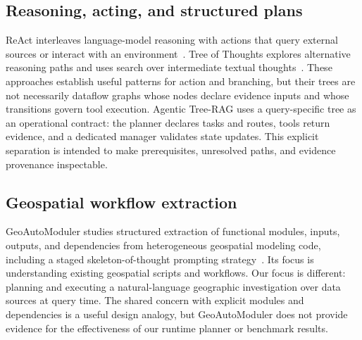 \subsection{Reasoning, acting, and structured plans}
ReAct interleaves language-model reasoning with actions that query external sources or interact with an environment~\cite{yao2023react}. Tree of Thoughts explores alternative reasoning paths and uses search over intermediate textual thoughts~\cite{yao2023tot}. These approaches establish useful patterns for action and branching, but their trees are not necessarily dataflow graphs whose nodes declare evidence inputs and whose transitions govern tool execution. Agentic Tree-RAG uses a query-specific tree as an operational contract: the planner declares tasks and routes, tools return evidence, and a dedicated manager validates state updates. This explicit separation is intended to make prerequisites, unresolved paths, and evidence provenance inspectable.

\subsection{Geospatial workflow extraction}
GeoAutoModuler studies structured extraction of functional modules, inputs, outputs, and dependencies from heterogeneous geospatial modeling code, including a staged skeleton-of-thought prompting strategy~\cite{liang2026geoautomoduler}. Its focus is understanding existing geospatial scripts and workflows. Our focus is different: planning and executing a natural-language geographic investigation over data sources at query time. The shared concern with explicit modules and dependencies is a useful design analogy, but GeoAutoModuler does not provide evidence for the effectiveness of our runtime planner or benchmark results.
